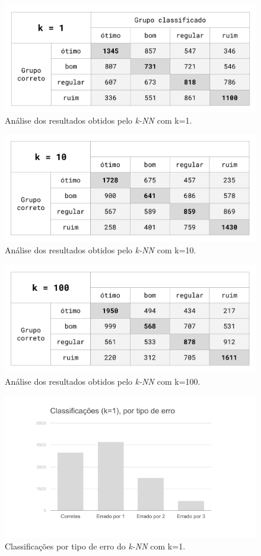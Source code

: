 \documentclass[12pt]{article}
\begin{document}
\begin{figure}[H]
\centering\includegraphics[width=.60\linewidth]{plot-white1.png}
\caption{Análise dos resultados obtidos pelo \emph{k-NN} com k=1.}
\label{fig:tab1}
\end{figure}

\begin{figure}[H]
\centering\includegraphics[width=.60\linewidth]{plot-white10.png}
\caption{Análise dos resultados obtidos pelo \emph{k-NN} com k=10.}
\label{fig:tab10}
\end{figure}

\begin{figure}[H]
\centering\includegraphics[width=.60\linewidth]{plot-white100.png}
\caption{Análise dos resultados obtidos pelo \emph{k-NN} com k=100.}
\label{fig:tab100}
\end{figure}

\begin{figure}[H]
\centering\includegraphics[width=.65\linewidth]{graf-white1.png}
\caption{Classificações por tipo de erro do \emph{k-NN} com k=1.}
\label{fig:graf1}
\end{figure}
\end{document}
